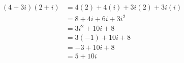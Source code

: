 \documentclass[preview]{standalone}
\begin{document}
\begin{center}
\begin{align*}(4+3i)(2+i) &= 4(2) + 4(i) + 3i(2) + 3i(i) \\ &= 8 + 4i + 6i + 3i^2 \\ &= 3i^2 + 10i + 8 \\ &= 3(-1) + 10i + 8 \\ &= -3 + 10i + 8 \\ &= 5 + 10i \end{align*}
\end{center}
\end{document}
